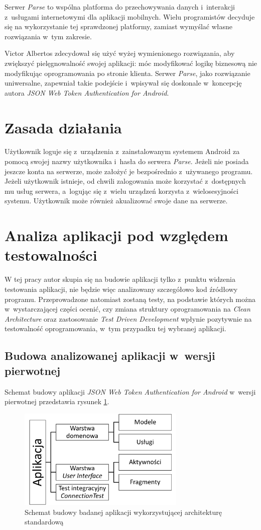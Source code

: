 Serwer \textit{Parse} to wspólna platforma do przechowywania danych i~interakcji z~usługami internetowymi dla aplikacji mobilnych. Wielu programistów decyduje się na wykorzystanie tej sprawdzonej platformy, zamiast wymyślać własne rozwiązania w~tym zakresie.

Victor Albertos zdecydował się użyć wyżej wymienionego rozwiązania, aby zwiększyć pielęgnowalność swojej aplikacji: móc modyfikować logikę biznesową nie modyfikując oprogramowania po stronie klienta. Serwer \textit{Parse}, jako rozwiązanie uniwersalne, zapewniał takie podejście i~wpisywał się doskonale w~koncepcję autora \textit{JSON Web Token Authentication for Android}.

\section{Zasada działania}
Użytkownik loguje się z~urządzenia z~zainstalowanym systemem Android za pomocą swojej nazwy użytkownika i~hasła do serwera \textit{Parse}. Jeżeli nie posiada jeszcze konta na serwerze, może założyć je bezpośrednio z~używanego programu. Jeżeli użytkownik istnieje, od chwili zalogowania może korzystać z~dostępnych mu usług serwera, a~logując się z~wielu urządzeń korzysta z~wielosesyjności systemu.  Użytkownik może również akualizować swoje dane na serwerze.

\section{Analiza aplikacji pod względem testowalności}
\label{analiza testowalnosci}
W tej pracy autor skupia się na budowie aplikacji tylko z~punktu widzenia testowania aplikacji, nie będzie więc analizowany szczegółowo kod źródłowy programu. Przeprowadzone natomiast zostaną testy, na podstawie których można w~wystarczającej części ocenić, czy zmiana struktury oprogramowania na \textit{Clean Architecture} oraz zastosowanie  \textit{Test Driven Development} wpłynie pozytywnie na testowalność oprogramowania, w~tym przypadku tej wybranej aplikacji.

\newpage
\subsection{Budowa analizowanej aplikacji w~wersji pierwotnej}
Schemat budowy aplikacji \textit{JSON Web Token Authentication for Android} w~wersji pierwotnej przedstawia rysunek \ref{fig:app_std}.

\begin{figure}[!htb]
    \centering
    \includegraphics[width=8cm]{imgs/ch6_app_st_diagram.png}
    \caption
{Schemat budowy badanej aplikacji wykorzystującej architekturę standardową}
    \label{fig:app_std}
\end{figure} 

